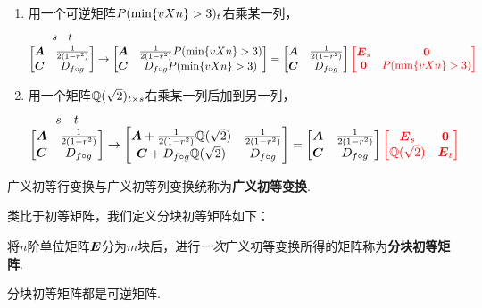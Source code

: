 \begin{definition}
\begin{enumerate}
\item 用一个可逆矩阵\(\P_t\)右乘某一列，\[
\originalmatrixHead \to \begin{bmatrix}
\A & \B \P \\
\C & \D \P
\end{bmatrix} = \originalmatrix {\color{red} \begin{bmatrix}
\E_s & \z \\
\z & \P
\end{bmatrix}}
\]

\item 用一个矩阵\(\Q_{t \times s}\)右乘某一列后加到另一列，\[
\originalmatrixHead \to \begin{bmatrix}
\A + \B \Q & \B \\
\C + \D \Q & \D
\end{bmatrix} = \originalmatrix {\color{red} \begin{bmatrix}
\E_s & \z \\
\Q & \E_t
\end{bmatrix}}
\]
\end{enumerate}

广义初等行变换与广义初等列变换统称为\textbf{广义初等变换}.
\end{definition}

类比于初等矩阵，我们定义分块初等矩阵如下：
\begin{definition}
将\(n\)阶单位矩阵\(\E\)分为\(m\)块后，进行\emph{一次}广义初等变换所得的矩阵称为\textbf{分块初等矩阵}.
\end{definition}

\begin{property}
分块初等矩阵都是可逆矩阵.
\end{property}

